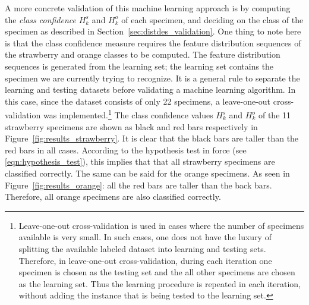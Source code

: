 \documentclass {udthesis}
\begin{document}
A more concrete validation of this machine learning approach is by computing the \emph{class confidence} $H^s_k$ and $H^o_k$ of each specimen, and deciding on the class of the specimen as described in Section~\ref{sec:distdes_validation}. One thing to note here is that the class confidence measure requires the feature distribution sequences of the strawberry and orange classes to be computed. The feature distribution sequences is generated from the learning set; the learning set contains the specimen we are currently trying to recognize. It is a general rule to separate the learning and testing datasets before validating a machine learning algorithm. In this case, since the dataset consists of only 22 specimens, a leave-one-out cross-validation \cite{alpaydin} was implemented.\footnote{Leave-one-out cross-validation is used in cases where the number of specimens available is very small. In such cases, one does not have the luxury of splitting the available labeled dataset into 
learning and testing sets. Therefore, in leave-one-out cross-validation, during each iteration one 
specimen is chosen as the testing set and the all other specimens are chosen as the learning set. Thus the learning procedure is repeated in each iteration, without adding the instance that is being tested to the learning set.} The class confidence values $H^s_k$ and $H^o_k$ of the 11 strawberry specimens are shown as black and red bars respectively in Figure~\ref{fig:results_strawberry}. It is clear that the black bars are taller than the red bars in all cases. According to the hypothesis test in force (see \eqref{eqn:hypothesis_test}), this implies that that all strawberry specimens are classified correctly. The same can be said for the orange specimens. As seen in Figure~\ref{fig:results_orange}: all the red bars are taller than the back bars. Therefore, all orange specimens are also classified correctly.
\end{document}
